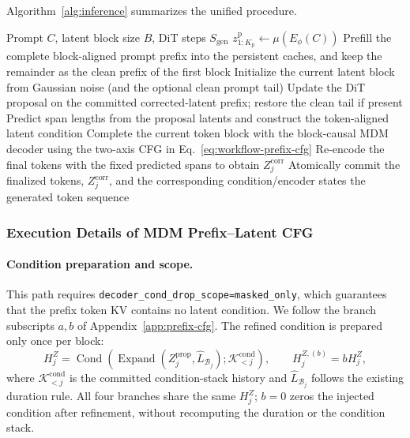 Algorithm~\ref{alg:inference} summarizes the unified procedure.

\begin{algorithm}[t]
\caption{Unified block-wise inference of \method}
\label{alg:inference}
\begin{algorithmic}[1]
    \Require Prompt $C$, latent block size $B$, DiT steps $S_{\mathrm{gen}}$
    \State $z^{\mathrm p}_{1:K_{\mathrm p}}\gets\mu(E_\phi(C))$
    \State Prefill the complete block-aligned prompt prefix into the persistent caches, and keep the remainder as the clean prefix of the first block
        \State Initialize the current latent block from Gaussian noise (and the optional clean prompt tail)
            \State Update the DiT proposal on the committed corrected-latent prefix; restore the clean tail if present
        \EndFor
        \State Predict span lengths from the proposal latents and construct the token-aligned latent condition
        \State Complete the current token block with the block-causal MDM decoder using the two-axis CFG in Eq.~\eqref{eq:workflow-prefix-cfg}
        \State Re-encode the final tokens with the fixed predicted spans to obtain $Z_j^{\mathrm{corr}}$
        \State Atomically commit the finalized tokens, $Z_j^{\mathrm{corr}}$, and the corresponding condition/encoder states
    \EndWhile
    \State \Return the generated token sequence
\end{algorithmic}
\end{algorithm}

\subsubsection{Execution Details of MDM Prefix--Latent CFG}
\label{app:prefix-cfg-implementation}

\paragraph{Condition preparation and scope.}
This path requires \texttt{decoder\_cond\_drop\_scope=masked\_only}, which guarantees that the prefix token KV contains no latent condition. We follow the branch subscripts $a,b$ of Appendix~\ref{app:prefix-cfg}. The refined condition is prepared only once per block:
\begin{equation}
    H_j^Z
    =\operatorname{Cond}\!\left(
      \operatorname{Expand}(Z_j^{\mathrm{prop}},\widehat L_{\mathcal B_j});
      \mathcal K^{\mathrm{cond}}_{<j}\right),
    \qquad H_j^{Z,(b)}=bH_j^Z,
    \label{eq:app-prefix-cfg-condition}
\end{equation}
where $\mathcal K^{\mathrm{cond}}_{<j}$ is the committed condition-stack history and $\widehat L_{\mathcal B_j}$ follows the existing duration rule. All four branches share the same $H_j^Z$; $b=0$ zeros the injected condition after refinement, without recomputing the duration or the condition stack.

